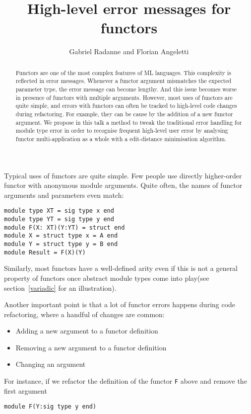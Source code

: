 \documentclass{article}
\title{High-level error messages for functors}
\author{Gabriel Radanne and Florian Angeletti}
\begin{document}
\maketitle

\begin{abstract}
Functors are one of the most complex features of ML languages. This complexity is reflected in error messages.
Whenever a functor argument mismatches the expected parameter type, the error message can become lengthy.
And this issue becomes worse in presence of functors with multiple arguments.
However, most uses of functors are quite simple, and errors with functors can often be tracked to high-level code changes during refactoring.
For example, they can be cause by the addition of a new functor argument.
We propose in this talk a method to tweak the traditional error handling
for module type error in order to recognise frequent high-level user error
by analysing functor multi-application as a whole with a edit-distance minimisation
algorithm.
\end{abstract}


Typical uses of functors are quite simple. Few people use directly higher-order functor with anonymous module arguments. Quite often, the names of functor arguments and parameters even match:
\begin{verbatim}
module type XT = sig type x end
module type YT = sig type y end
module F(X: XT)(Y:YT) = struct end
module X = struct type x = A end
module Y = struct type y = B end
module Result = F(X)(Y)
\end{verbatim}
Similarly, most functors have a well-defined arity even if this is not a general property of functors once abstract module types come into play(see section~\ref{variadic} for an illustration).

Another important point is that a lot of functor errors happens during code refactoring, where a handful of changes are common:
\begin{itemize}
\item Adding a new argument to a functor definition
\item Removing a new argument to a functor definition
\item Changing an argument
\end{itemize}

For instance, if we refactor the definition of the functor \texttt{F} above and remove the first argument

\begin{verbatim}
module F(Y:sig type y end)
\end{verbatim}
\end{document}

